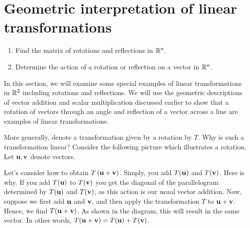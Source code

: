\section{Geometric interpretation of linear transformations}

\begin{outcome}
  \begin{enumerate}
  \item Find the matrix of rotations and reflections in $\mathbb{R}^n$.
  \item Determine the action of a rotation or reflection on a vector in $\mathbb{R}^n$.
  \end{enumerate}
\end{outcome}

In this section, we will examine some special examples of linear transformations in $\mathbb{R}^2$ including rotations and reflections. We will use the geometric descriptions of vector addition and scalar
multiplication discussed earlier to show that a rotation of vectors through an angle and reflection of a vector across a line are examples of
linear transformations. 

More generally, denote a transformation given by a rotation by $T$. Why is such a transformation
linear? Consider the following picture which illustrates a rotation. Let $\mbox{\bf u},\mbox{\bf v}$ denote vectors. 

\begin{center}
\end{center}

Let's consider how to obtain $T\left(\mbox{\bf u}+\mbox{\bf v}\right)$. 
Simply, you add $T (\mbox{\bf u})$ and $T(\mbox{\bf v})$. 
Here is why. If you add $T(\mbox{\bf u})$ to $T(\mbox{\bf v})$ you get
the diagonal of the parallelogram determined by $T(\mbox{\bf u})$ and $T(\mbox{\bf v})$, as this action
is our usual vector addition.
Now, suppose we first add $\mbox{\bf u}$ and $\mbox{\bf v}$, and then apply the transformation $T$ to 
$\mbox{\bf u}+\mbox{\bf v}$. Hence, we find $T( \mbox{\bf u}+\mbox{\bf v})$. 
As shown in the diagram, this will result in the same vector. In other words, $T(\mbox{\bf u}+\mbox{\bf v}) = T(\mbox{\bf u}) 
+ T(\mbox{\bf v})$. 

